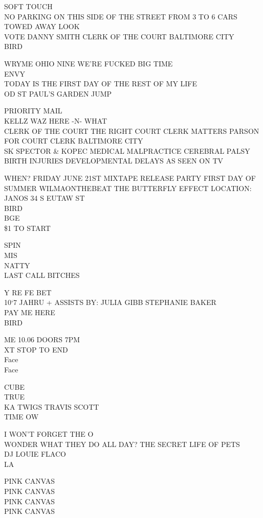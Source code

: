 \documentclass[10pt,letterpaper]{article}
\begin{document}
SOFT TOUCH\\
NO PARKING ON THIS SIDE OF THE STREET FROM 3 TO 6 CARS TOWED AWAY LOOK\\
VOTE DANNY SMITH CLERK OF THE COURT BALTIMORE CITY\\
BIRD

WRYME OHIO NINE WE'RE FUCKED BIG TIME\\
ENVY\\
TODAY IS THE FIRST DAY OF THE REST OF MY LIFE\\
OD ST PAUL'S GARDEN JUMP

PRIORITY MAIL\\
KELLZ WAZ HERE {-}N{-} WHAT\\
CLERK OF THE COURT THE RIGHT COURT CLERK MATTERS PARSON FOR COURT CLERK BALTIMORE CITY\\
SK SPECTOR \& KOPEC MEDICAL MALPRACTICE CEREBRAL PALSY BIRTH INJURIES DEVELOPMENTAL DELAYS AS SEEN ON TV

WHEN?  FRIDAY JUNE 21ST MIXTAPE RELEASE PARTY FIRST DAY OF SUMMER WILMAONTHEBEAT THE BUTTERFLY EFFECT LOCATION: JANOS 34 S EUTAW ST\\
BIRD\\
BGE\\
\$1 TO START

SPIN\\
MIS\\
NATTY\\
LAST CALL BITCHES

Y RE FE BET\\
10`7 JAHRU + ASSISTS BY: JULIA GIBB STEPHANIE BAKER\\
PAY ME HERE\\
BIRD

ME 10.06 DOORS 7PM\\
XT STOP TO END\\
Face\\
Face

CUBE\\
TRUE\\
KA TWIGS TRAVIS SCOTT\\
TIME OW

I WON'T FORGET THE O\\
WONDER WHAT THEY DO ALL DAY?  THE SECRET LIFE OF PETS\\
DJ LOUIE FLACO\\
LA

PINK CANVAS\\
PINK CANVAS\\
PINK CANVAS\\
PINK CANVAS
\end{document}
